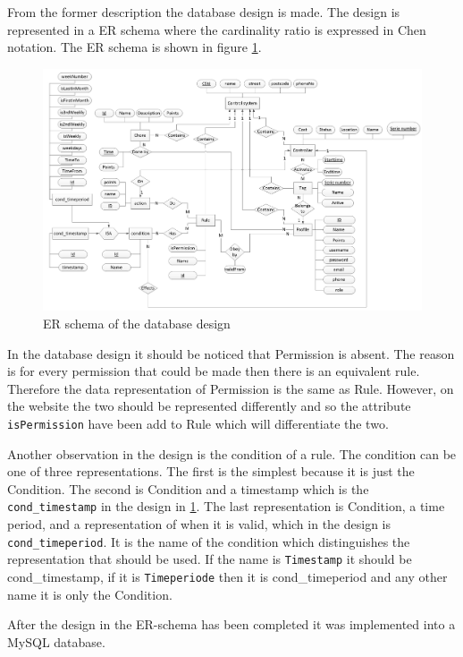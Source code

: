 From the former description the database design is made. The design is represented in a ER schema where the cardinality ratio is expressed in 
Chen notation. The ER schema is shown in figure \ref{fig:ERdiagram}. 

\begin{figure}
	\centering
		\includegraphics[width=1.00\textwidth]{images/ERdiagram.jpg}
	\caption{ER schema of the database design}
	\label{fig:ERdiagram}
\end{figure}

In the database design it should be noticed that Permission is absent. The reason is for every permission that could be made then there is an equivalent rule. Therefore the data representation of Permission is the same as Rule. However, on the website the two should be represented differently and so the attribute \texttt{isPermission} have been add to Rule which will differentiate the two.

Another observation in the design is the condition of a rule. The condition can be one of three representations. The first is the simplest because it is just the Condition. The second is Condition and a timestamp which is the \texttt{cond\_timestamp} in the design in \ref{fig:ERdiagram}. The last representation is Condition, a time period, and a representation of when it is valid, which in the design is \texttt{cond\_timeperiod}. 
 It is the name of the condition which distinguishes the representation that should be used. If the name is \texttt{Timestamp} it should be cond\_timestamp, if it is \texttt{Timeperiode} then it is cond\_timeperiod and any other name it is only the Condition. 

After the design in the ER-schema has been completed it was implemented into a MySQL database.  

